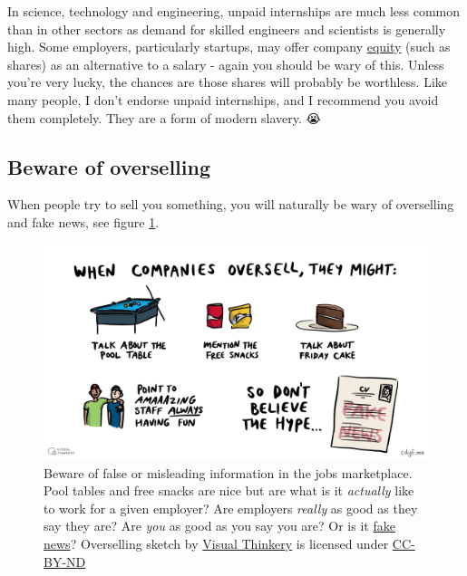 \documentclass[
]{book}
\begin{document}
In science, technology and engineering, unpaid internships are much less common than in other sectors as demand for skilled engineers and scientists is generally high. Some employers, particularly startups, may offer company \href{https://en.wikipedia.org/wiki/Equity_(finance)}{equity} (such as shares) as an alternative to a salary - again you should be wary of this. Unless you're very lucky, the chances are those shares will probably be worthless. Like many people, I don't endorse unpaid internships, and I recommend you avoid them completely. They are a form of modern slavery. 😭

\hypertarget{oversell}{%
\subsection{Beware of overselling}\label{oversell}}

When people try to sell you something, you will naturally be wary of overselling and fake news, see figure \ref{fig:fakenews-fig}.

\begin{figure}

{\centering \includegraphics[width=0.98\linewidth]{images/overselling} 

}

\caption{Beware of false or misleading information in the jobs marketplace. Pool tables and free snacks are nice but are what is it \emph{actually} like to work for a given employer? Are employers \emph{really} as good as they say they are? Are \emph{you} as good as you say you are? Or is it \href{https://en.wikipedia.org/wiki/Fake_news}{fake news}? Overselling sketch by \href{https://visualthinkery.com/}{Visual Thinkery} is licensed under \href{https://creativecommons.org/licenses/by-nd/4.0/}{CC-BY-ND}}\label{fig:fakenews-fig}
\end{figure}
\end{document}
